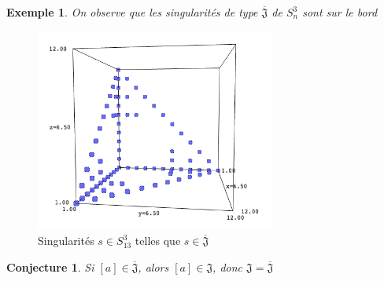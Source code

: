 \documentclass{article}
\newtheorem{conjecture}{Conjecture}
\newtheorem{example}{Exemple}
\newcommand{\J}{\mathfrak{J}}
\newcommand{\JS}{\overline{\J}}
\begin{document}
\begin{example}
    On observe que les singularités de type $\JS$ de $S_n^3$ sont sur le bord
\end{example}
\begin{figure}[h]
    \caption{Singularités $s \in S_{13}^3$ telles que $s \in \JS$}
    \centering
    \includegraphics[width=0.7\textwidth]{singularite_j_strict_m3_n13}
\end{figure}

\begin{conjecture}
    Si $[a] \in \JS$, alors $[a] \in \J$, donc $\J = \JS$
\end{conjecture}

\end{document}
